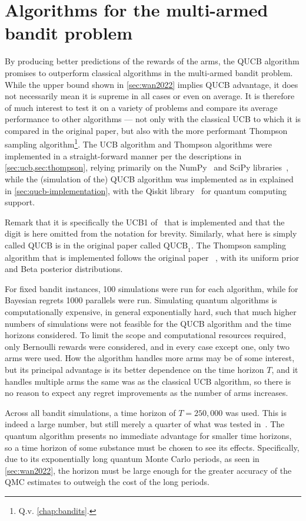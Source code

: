 \section{Algorithms for the multi-armed bandit problem}
By producing better predictions of the rewards of the arms, the QUCB algorithm promises to outperform classical algorithms in the multi-armed bandit problem.
While the upper bound shown in \cref{sec:wan2022} implies QUCB advantage, it does not necessarily mean it is supreme in all cases or even on average.
It is therefore of much interest to test it on a variety of problems and compare its average performance to other algorithms — not only with the classical UCB to which it is compared in the original paper, but also with the more performant Thompson sampling algorithm\footnote{Q.v. \cref{chap:bandits}.}.
The UCB algorithm and Thompson algorithms were implemented in a straight-forward manner per the descriptions in \cref{sec:ucb,sec:thompson}, relying primarily on the NumPy~\autocite{numpy} and SciPy libraries~\autocite{scipy}, while the (simulation of the) QUCB algorithm was implemented as in explained in \cref{sec:qucb-implementation}, with the Qiskit library~\autocite{qiskit} for quantum computing support.

Remark that it is specifically the UCB1 of~\autocite{auer2002} that is implemented and that the digit is here omitted from the notation for brevity.
Similarly, what here is simply called QUCB is in the original paper called $\text{QUCB}_1$.
The Thompson sampling algorithm that is implemented follows the original paper ~\autocite{thompson1933}, with its uniform prior and Beta posterior distributions.

For fixed bandit instances, 100 simulations were run for each algorithm, while for Bayesian regrets 1000 parallels were run.
Simulating quantum algorithms is computationally expensive, in general exponentially hard, such that much higher numbers of simulations were not feasible for the QUCB algorithm and the time horizons considered.
To limit the scope and computational resources required, only Bernoulli rewards were considered, and in every case except one, only two arms were used.
How the algorithm handles more arms may be of some interest, but its principal advantage is its better dependence on the time horizon $T$, and it handles multiple arms the same was as the classical UCB algorithm, so there is no reason to expect any regret improvements as the number of arms increases.

Across all bandit simulations, a time horizon of $T=250,000$ was used.
This is indeed a large number, but still merely a quarter of what was tested in~\autocite{wan2022}.
The quantum algorithm presents no immediate advantage for smaller time horizons, so  a time horizon of some substance must be chosen to see its effects.
Specifically, due to its exponentially long quantum Monte Carlo periods, as seen in \cref{sec:wan2022}, the horizon must be large enough for the greater accuracy of the QMC estimates to outweigh the cost of the long periods.

